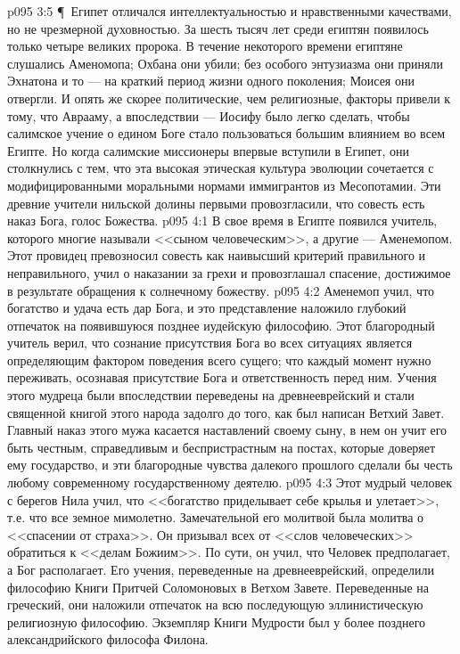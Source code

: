 \vs p095 3:5 \P\ Египет отличался интеллектуальностью и нравственными качествами, но не чрезмерной духовностью. За шесть тысяч лет среди египтян появилось только четыре великих пророка. В течение некоторого времени египтяне слушались Аменомопа; Охбана они убили; без особого энтузиазма они приняли Эхнатона и то --- на краткий период жизни одного поколения; Моисея они отвергли. И опять же скорее политические, чем религиозные, факторы привели к тому, что Аврааму, а впоследствии --- Иосифу было легко сделать, чтобы салимское учение о едином Боге стало пользоваться большим влиянием во всем Египте. Но когда салимские миссионеры впервые вступили в Египет, они столкнулись с тем, что эта высокая этическая культура эволюции сочетается с модифицированными моральными нормами иммигрантов из Месопотамии. Эти древние учители нильской долины первыми провозгласили, что совесть есть наказ Бога, голос Божества.
\vs p095 4:1 В свое время в Египте появился учитель, которого многие называли <<сыном человеческим>>, а другие --- Аменемопом. Этот провидец превозносил совесть как наивысший критерий правильного и неправильного, учил о наказании за грехи и провозглашал спасение, достижимое в результате обращения к солнечному божеству.
\vs p095 4:2 Аменемоп учил, что богатство и удача есть дар Бога, и это представление наложило глубокий отпечаток на появившуюся позднее иудейскую философию. Этот благородный учитель верил, что сознание присутствия Бога во всех ситуациях является определяющим фактором поведения всего сущего; что каждый момент нужно переживать, осознавая присутствие Бога и ответственность перед ним. Учения этого мудреца были впоследствии переведены на древнееврейский и стали священной книгой этого народа задолго до того, как был написан Ветхий Завет. Главный наказ этого мужа касается наставлений своему сыну, в нем он учит его быть честным, справедливым и беспристрастным на постах, которые доверяет ему государство, и эти благородные чувства далекого прошлого сделали бы честь любому современному государственному деятелю.
\vs p095 4:3 Этот мудрый человек с берегов Нила учил, что <<богатство приделывает себе крылья и улетает>>, т.е. что все земное мимолетно. Замечательной его молитвой была молитва о <<спасении от страха>>. Он призывал всех от <<слов человеческих>> обратиться к <<делам Божиим>>. По сути, он учил, что Человек предполагает, а Бог располагает. Его учения, переведенные на древнееврейский, определили философию Книги Притчей Соломоновых в Ветхом Завете. Переведенные на греческий, они наложили отпечаток на всю последующую эллинистическую религиозную философию. Экземпляр Книги Мудрости был у более позднего александрийского философа Филона.
